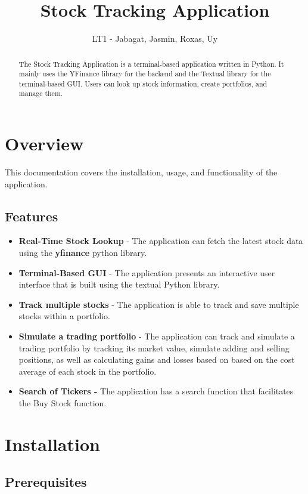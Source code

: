 \documentclass{article}
\title{Stock Tracking Application}
\author{LT1 - Jabagat, Jasmin, Roxas, Uy}
\begin{document}
\maketitle

\begin{abstract}
The Stock Tracking Application is a terminal-based application written in Python. It mainly uses the YFinance library for the backend and the Textual library for the terminal-based GUI. Users can look up stock information, create portfolios, and manage them. 
\end{abstract}

\section{Overview}

This documentation covers the installation, usage, and functionality of the application. 

\subsection{Features}

\begin{itemize}
    \item \textbf{Real-Time Stock Lookup} - The application can fetch the latest stock data using the \textbf{yfinance} python library. 
    \item \textbf{Terminal-Based GUI} - The application presents an interactive user interface that is built using the textual Python library. 
    \item \textbf{Track multiple stocks} - The application is able to track and save multiple stocks within a portfolio. 
    \item \textbf{Simulate a trading portfolio } - The application can track and simulate a trading portfolio by tracking its market value, simulate adding and selling positions, as well as calculating gains and losses based on based on the cost average of each stock in the portfolio.
    \item \textbf{Search of Tickers - }The application has a search function that facilitates the Buy Stock function.
\end{itemize}


\section{Installation}

\subsection{Prerequisites}
\end{document}
